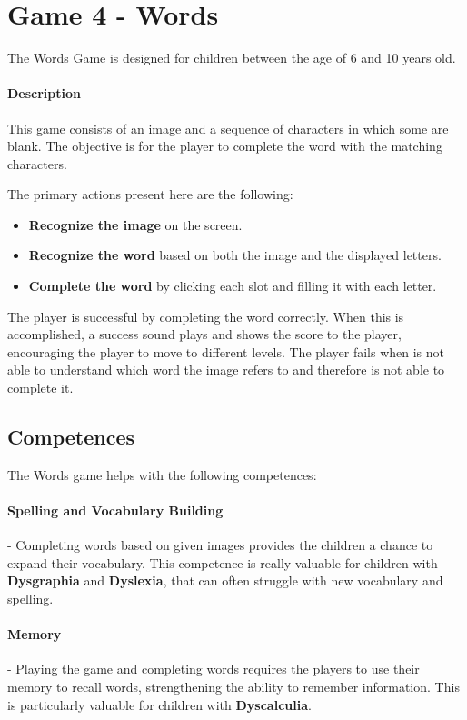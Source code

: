 \newpage
\section{Game 4 - Words}
The Words Game is designed for children between the age of 6 and 10 years old.

\paragraph{Description}
This game consists of an image and a sequence of characters in which some are blank. The objective is for the player to complete the word with the matching characters.

The primary actions present here are the following:

\begin{itemize}
    \item \textbf{Recognize the image} on the screen.
    \item \textbf{Recognize the word} based on both the image and the displayed letters.
    \item \textbf{Complete the word} by clicking each slot and filling it with each letter.
\end{itemize}

The player is successful by completing the word correctly. When this is accomplished, a success sound plays and shows the score to the player, encouraging the player to move to different levels.
The player fails when is not able to understand which word the image refers to and therefore is not able to complete it.

\subsection*{Competences}
The Words game helps with the following competences:

\paragraph{Spelling and Vocabulary Building}- Completing words based on given images provides the children a chance to expand their vocabulary. This competence is really valuable for children with \textbf{Dysgraphia} and \textbf{Dyslexia}, that can often struggle with new vocabulary and spelling.

\paragraph{Memory}- Playing the game and completing words requires the players to use their memory to recall words, strengthening the ability to remember information. This is particularly valuable for children with \textbf{Dyscalculia}.

